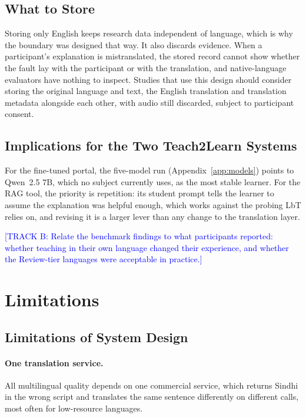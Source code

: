 \documentclass[pdflatex,sn-mathphys-num]{sn-jnl}%
\newcommand{\trackb}[1]{\textcolor{blue}{[TRACK B: #1]}}
\theoremstyle{thmstyleone}%
\theoremstyle{thmstyletwo}%
\theoremstyle{thmstylethree}%
\begin{document}
\subsection{What to Store}\label{sec:disc-storage}

Storing only English keeps research data independent of language, which is why the boundary was
designed that way. It also discards evidence. When a participant's explanation is mistranslated,
the stored record cannot show whether the fault lay with the participant or with the translation,
and native-language evaluators have nothing to inspect. Studies that use this design should consider
storing the original language and text, the English translation and translation metadata alongside
each other, with audio still discarded, subject to participant consent.

\subsection{Implications for the Two Teach2Learn Systems}

For the fine-tuned portal, the five-model run (Appendix~\ref{app:models}) points to Qwen~2.5 7B,
which no subject currently uses, as the most stable learner. For the RAG tool, the priority is
repetition: its student prompt tells the learner to assume the explanation was helpful enough, which
works against the probing LbT relies on, and revising it is a larger lever than any change to the
translation layer.

\trackb{Relate the benchmark findings to what participants reported: whether teaching in their own
language changed their experience, and whether the Review-tier languages were acceptable in
practice.}

\section{Limitations}\label{sec:limitations}

\subsection{Limitations of System Design}\label{sec:lim-system}

\paragraph{One translation service.} All multilingual quality depends on one commercial service,
which returns Sindhi in the wrong script and translates the same sentence differently on different
calls, most often for low-resource languages.
\end{document}
